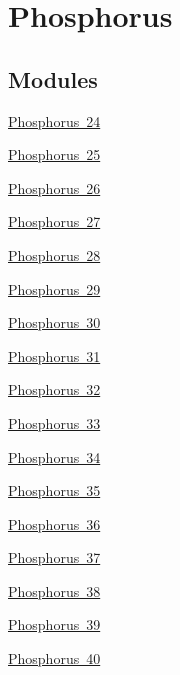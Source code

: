 \hypertarget{group___isotope_const-_phosphorus}{}\section{Phosphorus}
\label{group___isotope_const-_phosphorus}
\subsection*{Modules}
\begin{DoxyCompactItemize}
\item 
\mbox{\hyperlink{group___isotope_const-_phosphorus-_p24}{Phosphorus 24}}
\item 
\mbox{\hyperlink{group___isotope_const-_phosphorus-_p25}{Phosphorus 25}}
\item 
\mbox{\hyperlink{group___isotope_const-_phosphorus-_p26}{Phosphorus 26}}
\item 
\mbox{\hyperlink{group___isotope_const-_phosphorus-_p27}{Phosphorus 27}}
\item 
\mbox{\hyperlink{group___isotope_const-_phosphorus-_p28}{Phosphorus 28}}
\item 
\mbox{\hyperlink{group___isotope_const-_phosphorus-_p29}{Phosphorus 29}}
\item 
\mbox{\hyperlink{group___isotope_const-_phosphorus-_p30}{Phosphorus 30}}
\item 
\mbox{\hyperlink{group___isotope_const-_phosphorus-_p31}{Phosphorus 31}}
\item 
\mbox{\hyperlink{group___isotope_const-_phosphorus-_p32}{Phosphorus 32}}
\item 
\mbox{\hyperlink{group___isotope_const-_phosphorus-_p33}{Phosphorus 33}}
\item 
\mbox{\hyperlink{group___isotope_const-_phosphorus-_p34}{Phosphorus 34}}
\item 
\mbox{\hyperlink{group___isotope_const-_phosphorus-_p35}{Phosphorus 35}}
\item 
\mbox{\hyperlink{group___isotope_const-_phosphorus-_p36}{Phosphorus 36}}
\item 
\mbox{\hyperlink{group___isotope_const-_phosphorus-_p37}{Phosphorus 37}}
\item 
\mbox{\hyperlink{group___isotope_const-_phosphorus-_p38}{Phosphorus 38}}
\item 
\mbox{\hyperlink{group___isotope_const-_phosphorus-_p39}{Phosphorus 39}}
\item 
\mbox{\hyperlink{group___isotope_const-_phosphorus-_p40}{Phosphorus 40}}
\item 

\end{DoxyCompactItemize}
